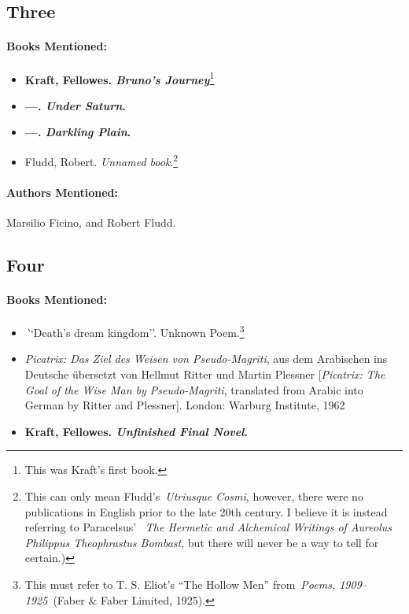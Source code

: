 \documentclass[12pt]{article}
\providecommand{\tightlist}{%
  \setlength{\itemsep}{0pt}\setlength{\parskip}{0pt}}
\begin{document}
\subsection{Three}\label{three-2}

\paragraph{Books Mentioned:}\label{books-mentioned-17}

\begin{itemize}
\tightlist
\item
  \textbf{Kraft, Fellowes. \emph{Bruno's Journey}}\footnote{This was Kraft's first book.}
\item
  \textbf{---. \emph{Under Saturn}.}
\item
  \textbf{---. \emph{Darkling Plain}.}
\item
  Fludd, Robert. \emph{Unnamed book}.\footnote{This can only mean Fludd's~\emph{Utriusque Cosmi}, however, there were no publications in English prior to the late 20th century. I believe it is instead referring to Paracelsus' ~\emph{The Hermetic and Alchemical Writings of Aureolus Philippus Theophrastus Bombast}, but there will never be a way to tell for certain.)}
\end{itemize}

\paragraph{Authors Mentioned:}\label{authors-mentioned-13}

Marsilio Ficino, and Robert Fludd.

\subsection{Four}\label{four-2}

\paragraph{Books Mentioned:}\label{books-mentioned-18}

\begin{itemize}
\tightlist
\item
  \emph``{Death's dream kingdom}''. Unknown Poem.\footnote{This must refer to T. S. Eliot's ``The Hollow Men'' from~\emph{Poems, 1909--1925}~(Faber \& Faber Limited, 1925).}
\item
  \emph{Picatrix: Das Ziel des Weisen von Pseudo-Magriti}, aus dem Arabischen ins Deutsche übersetzt von Hellmut Ritter und Martin Plessner {[}\emph{Picatrix: The Goal of the Wise Man by Pseudo-Magriti}, translated from Arabic into German by Ritter and Plessner{]}. London: Warburg Institute, 1962
\item
  \textbf{Kraft, Fellowes. \emph{Unfinished Final Novel}.}
\end{itemize}
\end{document}
